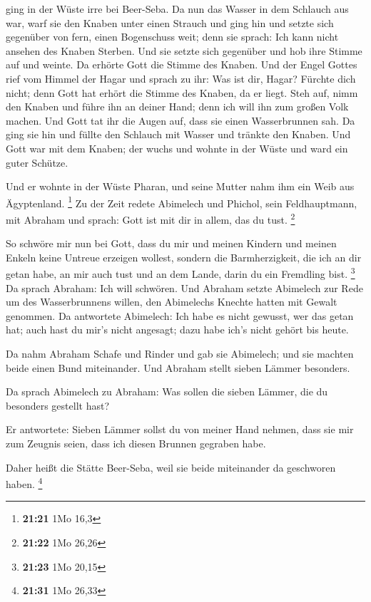 ging in der Wüste irre bei Beer-Seba.  Da nun das Wasser
in dem Schlauch aus war, warf sie den Knaben unter einen Strauch
 und ging hin und setzte sich gegenüber von fern, einen
Bogenschuss weit; denn sie sprach: Ich kann nicht ansehen des Knaben
Sterben. Und sie setzte sich gegenüber und hob ihre Stimme auf und
weinte.  Da erhörte Gott die Stimme des Knaben. Und der
Engel Gottes rief vom Himmel der Hagar und sprach zu ihr: Was ist dir,
Hagar? Fürchte dich nicht; denn Gott hat erhört die Stimme des Knaben,
da er liegt.  Steh auf, nimm den Knaben und führe ihn an
deiner Hand; denn ich will ihn zum großen Volk machen. 
Und Gott tat ihr die Augen auf, dass sie einen Wasserbrunnen sah. Da
ging sie hin und füllte den Schlauch mit Wasser und tränkte den Knaben.
 Und Gott war mit dem Knaben; der wuchs und wohnte in der
Wüste und ward ein guter Schütze.

 Und er wohnte in der Wüste Pharan, und seine Mutter nahm
ihm ein Weib aus Ägyptenland. \footnote{\textbf{21:21} 1Mo 16,3}
 Zu der Zeit redete Abimelech und Phichol, sein
Feldhauptmann, mit Abraham und sprach: Gott ist mit dir in allem, das du
tust. \footnote{\textbf{21:22} 1Mo 26,26}

 So schwöre mir nun bei Gott, dass du mir und meinen
Kindern und meinen Enkeln keine Untreue erzeigen wollest, sondern die
Barmherzigkeit, die ich an dir getan habe, an mir auch tust und an dem
Lande, darin du ein Fremdling bist. \footnote{\textbf{21:23} 1Mo 20,15}
 Da sprach Abraham: Ich will schwören. 
Und Abraham setzte Abimelech zur Rede um des Wasserbrunnens willen, den
Abimelechs Knechte hatten mit Gewalt genommen.  Da
antwortete Abimelech: Ich habe es nicht gewusst, wer das getan hat; auch
hast du mir's nicht angesagt; dazu habe ich's nicht gehört bis heute.

 Da nahm Abraham Schafe und Rinder und gab sie Abimelech;
und sie machten beide einen Bund miteinander.  Und
Abraham stellt sieben Lämmer besonders.

 Da sprach Abimelech zu Abraham: Was sollen die sieben
Lämmer, die du besonders gestellt hast?

 Er antwortete: Sieben Lämmer sollst du von meiner Hand
nehmen, dass sie mir zum Zeugnis seien, dass ich diesen Brunnen gegraben
habe.

 Daher heißt die Stätte Beer-Seba, weil sie beide
miteinander da geschworen haben. \footnote{\textbf{21:31} 1Mo 26,33}

